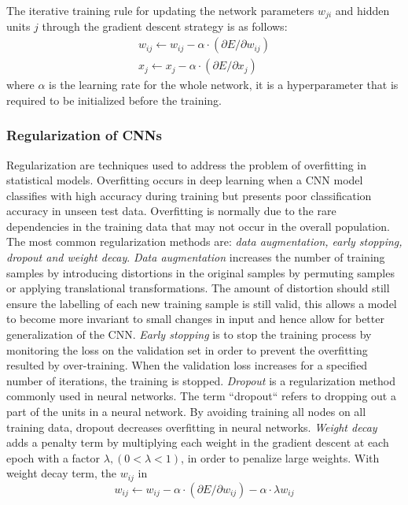 The iterative training rule for updating the network parameters $w_{ji}$ and hidden units $j$ through the gradient descent strategy is as follows:
\begin{equation}
\begin{matrix}
w_{ij}\leftarrow w_{ij}-\alpha \cdot (\partial E/\partial w_{ij})\\ 
x_j\leftarrow x_j-\alpha \cdot (\partial E/\partial x_{j})
\end{matrix}
\end{equation}
where $\alpha$ is the learning rate for the whole network, it is a hyperparameter that is required to be initialized before the training.

\subsubsection{Regularization of CNNs}
Regularization are techniques used to address the problem of overfitting in statistical models. Overfitting occurs in deep learning when a CNN model classifies with high accuracy during training but presents poor classification accuracy in unseen test data. Overfitting is normally due to the rare dependencies in the training data that may not occur in the overall population.  The most common regularization methods are: \textit{data augmentation, early stopping, dropout and weight decay}. \textit{Data augmentation} increases the number of training samples by introducing distortions in the original samples by permuting samples or applying translational transformations. The amount of distortion should still ensure the labelling of each new training sample is still valid, this allows a model to become more invariant to small changes in input and hence allow for better generalization of the CNN. \textit{Early stopping} is to stop the training process by monitoring the loss on the validation set in order to prevent the overfitting resulted by over-training. When the validation loss increases for a specified number of iterations, the training is stopped. \textit{Dropout} \cite{srivastava2014dropout} is a regularization method commonly used in neural networks. The term ``dropout`` refers to dropping out a part of the units in a neural network. By avoiding training all nodes on all training data, dropout decreases overfitting in neural networks. \textit{Weight decay} adds a penalty term by multiplying each weight in the gradient descent at each epoch with a factor $\lambda 
,(0<\lambda 
<1)$, in order to penalize large weights. With weight decay term, the $w_{ij}$ in 
\begin{equation}
w_{ij}\leftarrow w_{ij}-\alpha \cdot (\partial E/\partial w_{ij})-\alpha \cdot \lambda  w_{ij}
\end{equation}

